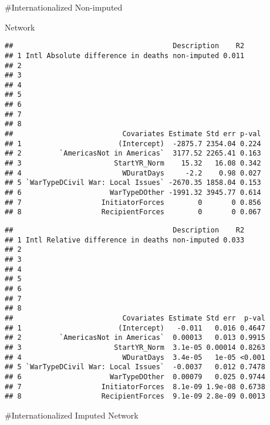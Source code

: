 \documentclass[
]{article}
\begin{document}
\#Internationalized Non-imputed

Network

\begin{verbatim}
##                                      Description    R2
## 1 Intl Absolute difference in deaths non-imputed 0.011
## 2                                                     
## 3                                                     
## 4                                                     
## 5                                                     
## 6                                                     
## 7                                                     
## 8                                                     
##                          Covariates Estimate Std err p-val
## 1                       (Intercept)  -2875.7 2354.04 0.224
## 2         `AmericasNot in Americas`  3177.52 2265.41 0.163
## 3                      StartYR_Norm    15.32   16.08 0.342
## 4                        WDuratDays     -2.2    0.98 0.027
## 5 `WarTypeDCivil War: Local Issues` -2670.35 1858.04 0.153
## 6                     WarTypeDOther -1991.32 3945.77 0.614
## 7                   InitiatorForces        0       0 0.856
## 8                   RecipientForces        0       0 0.067
\end{verbatim}

\begin{verbatim}
##                                      Description    R2
## 1 Intl Relative difference in deaths non-imputed 0.033
## 2                                                     
## 3                                                     
## 4                                                     
## 5                                                     
## 6                                                     
## 7                                                     
## 8                                                     
##                          Covariates Estimate Std err  p-val
## 1                       (Intercept)   -0.011   0.016 0.4647
## 2         `AmericasNot in Americas`  0.00013   0.013 0.9915
## 3                      StartYR_Norm  3.1e-05 0.00014 0.8263
## 4                        WDuratDays  3.4e-05   1e-05 <0.001
## 5 `WarTypeDCivil War: Local Issues`  -0.0037   0.012 0.7478
## 6                     WarTypeDOther  0.00079   0.025 0.9744
## 7                   InitiatorForces  8.1e-09 1.9e-08 0.6738
## 8                   RecipientForces  9.1e-09 2.8e-09 0.0013
\end{verbatim}

\#Internationalized Imputed Network
\end{document}
